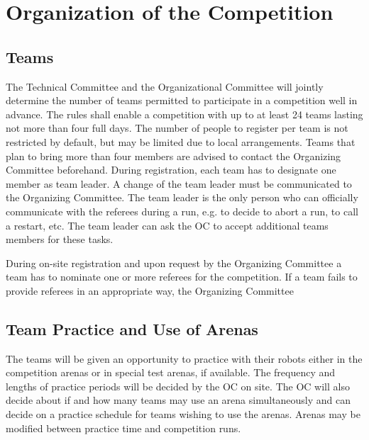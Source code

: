 \section{Organization of the Competition}\label{sec:participation_in_the_competition}


\subsection{Teams}
The Technical Committee and the Organizational Committee will jointly determine the number of teams permitted to participate in a competition well in advance. The rules shall enable a competition with up to at least 24 teams lasting not more than four full days.
The number of people to register per team is not restricted by default, but may be limited due to local arrangements. Teams that plan to bring more than four members are advised to contact the Organizing Committee beforehand. 
During registration, each team has to designate one member as team leader. A change of the team leader must be communicated to the Organizing Committee. The team leader is the only person who can officially communicate with the referees during a run, e.g. to decide to abort a run, to call a restart, etc. The team leader can ask the OC to accept additional teams members for these tasks. 
\par
During on-site registration and upon request by the Organizing Committee a team has to nominate one or more referees for the competition. If a team fails to provide referees in an appropriate way, the Organizing Committee 


\subsection{Team Practice and Use of Arenas}
The teams will be given an opportunity to practice with their robots either in the competition arenas or in special test arenas, if available. The frequency and lengths of practice periods will be decided by the OC on site. The OC will also decide about if and how many teams may use an arena simultaneously and can decide on a practice schedule for teams wishing to use the arenas. Arenas may be modified between practice time and competition runs. 
 
